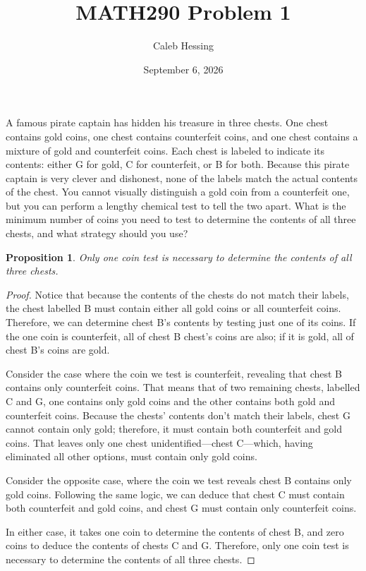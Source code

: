 \documentclass{article}
\title{MATH290 Problem 1}
\author{Caleb Hessing}
\date{September 6, 2026}
\newtheorem{proposition}{Proposition}
\begin{document}
\maketitle 

A famous pirate captain has hidden his treasure in three chests. One chest contains
gold coins, one chest contains counterfeit coins, and one chest contains a mixture of
gold and counterfeit coins. Each chest is labeled to indicate its contents: either G
for gold, C for counterfeit, or B for both. Because this pirate captain is very clever
and dishonest, none of the labels match the actual contents of the chest. You cannot
visually distinguish a gold coin from a counterfeit one, but you can perform a lengthy
chemical test to tell the two apart. What is the minimum number of coins you need to
test to determine the contents of all three chests, and what strategy should you use?

\begin{proposition}
    Only one coin test is necessary to determine the contents of all three chests.
\end{proposition}

\begin{proof}\nobreakspace

    Notice that because the contents of the chests do not match their labels,
    the chest labelled B must contain either all gold coins or all
    counterfeit coins. Therefore, we can determine chest B's contents
    by testing just one of its coins. If the one coin is counterfeit, all of chest
    B chest's coins are also; if it is gold, all of chest B's coins are gold.
    
    Consider the case where the coin we test is counterfeit, revealing that
    chest B contains only counterfeit coins. That means that of two remaining chests, labelled 
    C and G, one contains only gold coins and the other contains both
    gold and counterfeit coins. Because the chests' contents don't match their labels,
    chest G cannot contain only gold; therefore, it must contain both counterfeit and gold 
    coins. That leaves only one chest unidentified---chest C---which, having
    eliminated all other options, must contain only gold coins.

    Consider the opposite case, where the coin we test reveals chest B
    contains only gold coins. Following the same logic, we can deduce that
    chest C must contain both counterfeit and gold coins, and chest G must 
    contain only counterfeit coins.

    In either case, it takes one coin to determine the contents of chest B,
    and zero coins to deduce the contents of chests C and G. Therefore,
    only one coin test is necessary to determine the contents of all three chests.

\end{proof}
\end{document}
